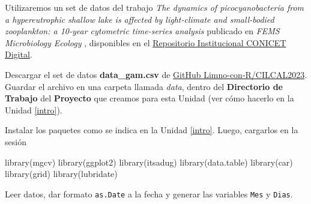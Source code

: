 \documentclass[
]{book}
\newenvironment{Shaded}{\begin{snugshade}}{\end{snugshade}}
\newcommand{\CommentTok}[1]{\textcolor[rgb]{0.56,0.35,0.01}{\textit{#1}}}
\newcommand{\DecValTok}[1]{\textcolor[rgb]{0.00,0.00,0.81}{#1}}
\newcommand{\FunctionTok}[1]{\textcolor[rgb]{0.00,0.00,0.00}{#1}}
\newcommand{\NormalTok}[1]{#1}
\newcommand{\OtherTok}[1]{\textcolor[rgb]{0.56,0.35,0.01}{#1}}
\newcommand{\SpecialCharTok}[1]{\textcolor[rgb]{0.00,0.00,0.00}{#1}}
\newcommand{\StringTok}[1]{\textcolor[rgb]{0.31,0.60,0.02}{#1}}
\begin{document}
Utilizaremos un set de datos del trabajo \emph{The dynamics of picocyanobacteria from a hypereutrophic shallow lake is affected by light-climate and small-bodied zooplankton: a 10-year cytometric time-series analysis} publicado en \emph{FEMS Microbiology Ecology} \citep{quiroga2021}, disponibles en el \href{http://hdl.handle.net/11336/200094}{Repositorio Institucional CONICET Digital}.

Descargar el set de datos \textbf{data\_gam.csv} de \href{https://github.com/Limno-con-R/CILCAL2023/tree/main/datasets}{GitHub Limno-con-R/CILCAL2023}.
Guardar el archivo en una carpeta llamada \emph{data}, dentro del \textbf{Directorio de Trabajo} del \textbf{Proyecto} que creamos para esta Unidad (ver cómo hacerlo en la Unidad \ref{intro}).

Instalar los paquetes como se indica en la Unidad \ref{intro}. Luego, cargarlos en la sesión

\begin{Shaded}
\begin{Highlighting}[]
\FunctionTok{library}\NormalTok{(mgcv)}
\FunctionTok{library}\NormalTok{(ggplot2)}
\FunctionTok{library}\NormalTok{(itsadug)}
\FunctionTok{library}\NormalTok{(data.table)}
\FunctionTok{library}\NormalTok{(car)}
\FunctionTok{library}\NormalTok{(grid)}
\FunctionTok{library}\NormalTok{(lubridate)}
\end{Highlighting}
\end{Shaded}

Leer datos, dar formato \texttt{as.Date} a la fecha y generar las variables \texttt{Mes} y \texttt{Dias}.

\begin{Shaded}
\end{Shaded}
\end{document}
